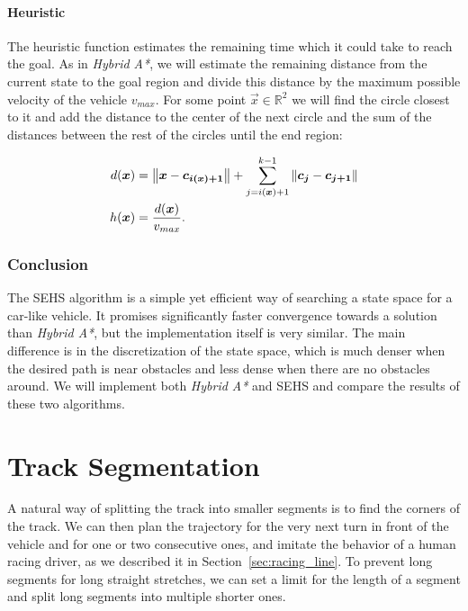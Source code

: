 \paragraph{Heuristic}
The heuristic function estimates the remaining time which it could take to reach the goal. As in \textit{Hybrid A*}, we will estimate the remaining distance from the current state to the goal region and divide this distance by the maximum possible velocity of the vehicle $v_{max}$. For some point $\vec{x}\in \mathbb{R}^2$ we will find the circle closest to it and add the distance to the center of the next circle and the sum of the distances between the rest of the circles until the end region:

\begin{equation*}
\begin{aligned}
d(\bm{x})&=\left\lVert\bm{x}-\bm{c_{i(\bm{x})+1}}\right\rVert+\sum_{j=i(\bm{x})+1}^{k-1} \left\lVert\bm{c_j}-\bm{c_{j+1}}\right\rVert \\
h(\bm{x})&=\dfrac{d(\bm{x})}{v_{max}}.
\end{aligned}
\end{equation*}

\subsubsection{Conclusion}

The \gls*{SEHS} algorithm is a simple yet efficient way of searching a state space for a car-like vehicle. It promises significantly faster convergence towards a solution than \textit{Hybrid A*}, but the implementation itself is very similar. The main difference is in the discretization of the state space, which is much denser when the desired path is near obstacles and less dense when there are no obstacles around. We will implement both \textit{Hybrid A*} and \gls*{SEHS} and compare the results of these two algorithms.

\section{Track Segmentation}

A natural way of splitting the track into smaller segments is to find the corners of the track. We can then plan the trajectory for the very next turn in front of the vehicle and for one or two  consecutive ones, and imitate the behavior of a human racing driver, as we described it in Section~\ref{sec:racing_line}. To prevent long segments for long straight stretches, we can set a limit for the length of a segment and split long segments into multiple shorter ones.

